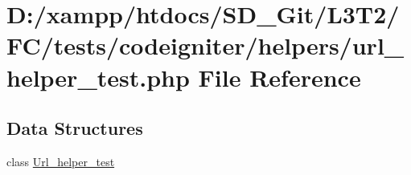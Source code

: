 \hypertarget{url__helper__test_8php}{}\section{D\+:/xampp/htdocs/\+S\+D\+\_\+\+Git/\+L3\+T2/\+F\+C/tests/codeigniter/helpers/url\+\_\+helper\+\_\+test.php File Reference}
\label{url__helper__test_8php}
\subsection*{Data Structures}
\begin{DoxyCompactItemize}
\item 
class \hyperlink{class_url__helper__test}{Url\+\_\+helper\+\_\+test}
\end{DoxyCompactItemize}
